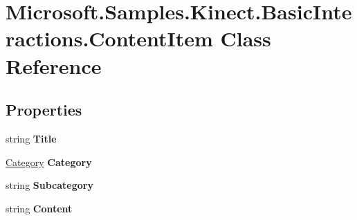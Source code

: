 \hypertarget{class_microsoft_1_1_samples_1_1_kinect_1_1_basic_interactions_1_1_content_item}{\section{Microsoft.\-Samples.\-Kinect.\-Basic\-Interactions.\-Content\-Item Class Reference}
\label{class_microsoft_1_1_samples_1_1_kinect_1_1_basic_interactions_1_1_content_item}
}
\subsection*{Properties}
\begin{DoxyCompactItemize}
\item 
\hypertarget{class_microsoft_1_1_samples_1_1_kinect_1_1_basic_interactions_1_1_content_item_a9f9d53ddce0695ac790b010d4a9fbe49}{string {\bfseries Title}}\label{class_microsoft_1_1_samples_1_1_kinect_1_1_basic_interactions_1_1_content_item_a9f9d53ddce0695ac790b010d4a9fbe49}

\item 
\hypertarget{class_microsoft_1_1_samples_1_1_kinect_1_1_basic_interactions_1_1_content_item_a8c0960752900a639f0d882f8b8d3e2bd}{\hyperlink{class_microsoft_1_1_samples_1_1_kinect_1_1_basic_interactions_1_1_category}{Category} {\bfseries Category}}\label{class_microsoft_1_1_samples_1_1_kinect_1_1_basic_interactions_1_1_content_item_a8c0960752900a639f0d882f8b8d3e2bd}

\item 
\hypertarget{class_microsoft_1_1_samples_1_1_kinect_1_1_basic_interactions_1_1_content_item_ae8cb597504c8f280fd099599cee39430}{string {\bfseries Subcategory}}\label{class_microsoft_1_1_samples_1_1_kinect_1_1_basic_interactions_1_1_content_item_ae8cb597504c8f280fd099599cee39430}

\item 
\hypertarget{class_microsoft_1_1_samples_1_1_kinect_1_1_basic_interactions_1_1_content_item_a319404ad1837387affd94fa6cc13fdd5}{string {\bfseries Content}}\label{class_microsoft_1_1_samples_1_1_kinect_1_1_basic_interactions_1_1_content_item_a319404ad1837387affd94fa6cc13fdd5}


\end{DoxyCompactItemize}
